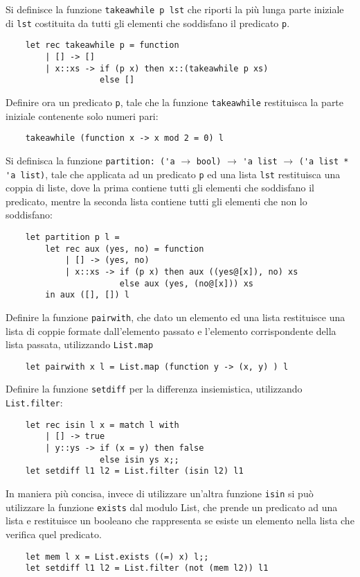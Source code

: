\documentclass{article}
\numberwithin{equation}{subsection}
\begin{document}
Si definisce la funzione \verb|takeawhile p lst| che riporti la più lunga parte iniziale di \verb|lst| costituita da tutti gli elementi che soddisfano il predicato \verb|p|. 
\begin{verbatim}
    let rec takeawhile p = function
        | [] -> []
        | x::xs -> if (p x) then x::(takeawhile p xs)
                   else []
\end{verbatim}
Definire ora un predicato \verb|p|, tale che la funzione \verb|takeawhile| restituisca la parte iniziale contenente solo numeri pari:
\begin{verbatim}
    takeawhile (function x -> x mod 2 = 0) l    
\end{verbatim}

Si definisca la funzione \verb|partition: ('a| $\rightarrow$ \verb|bool)| $\rightarrow$ \verb|'a list| $\rightarrow$ \verb|('a list * 'a list)|, tale che applicata ad un predicato \verb|p| ed una lista \verb|lst| restituisca una coppia di liste, dove la prima contiene tutti gli elementi che soddisfano il predicato, mentre la seconda lista contiene tutti gli elementi che non lo soddisfano:
\begin{verbatim}
    let partition p l =
        let rec aux (yes, no) = function
            | [] -> (yes, no)
            | x::xs -> if (p x) then aux ((yes@[x]), no) xs
                       else aux (yes, (no@[x])) xs
        in aux ([], []) l    
\end{verbatim}

Definire la funzione \verb|pairwith|, che dato un elemento ed una lista restituisce una lista di coppie formate dall'elemento passato e l'elemento corrispondente della lista passata, utilizzando \verb|List.map|
\begin{verbatim}
    let pairwith x l = List.map (function y -> (x, y) ) l
\end{verbatim}

Definire la funzione \verb|setdiff| per la differenza insiemistica, utilizzando \verb|List.filter|:
\begin{verbatim}
    let rec isin l x = match l with
        | [] -> true
        | y::ys -> if (x = y) then false
                   else isin ys x;;
    let setdiff l1 l2 = List.filter (isin l2) l1
\end{verbatim}
In maniera più concisa, invece di utilizzare un'altra funzione \verb|isin| si può utilizzare la funzione \verb|exists| dal modulo List, che prende un predicato ad una lista e restituisce un booleano che rappresenta se esiste un elemento nella lista che verifica quel predicato. 
\begin{verbatim}
    let mem l x = List.exists ((=) x) l;;
    let setdiff l1 l2 = List.filter (not (mem l2)) l1
\end{verbatim}
\end{document}
